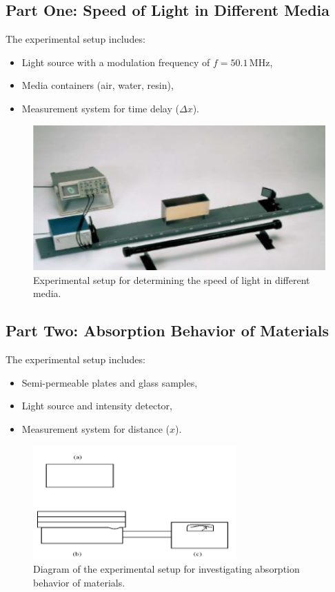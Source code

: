 \documentclass[journal]{IEEEtran}
\begin{document}
\subsection{Part One: Speed of Light in Different Media}
The experimental setup includes:
\begin{itemize}
    \item Light source with a modulation frequency of $f = 50.1 \, \text{MHz}$,
    \item Media containers (air, water, resin),
    \item Measurement system for time delay ($\Delta x$).
\end{itemize}

\begin{figure}[H]
    \centering
    \includegraphics[width=0.8\linewidth]{../IMAGES/speed_of_light_setup.png}
    \caption{Experimental setup for determining the speed of light in different media.}
    \label{fig:speed_of_light_setup}
\end{figure}

\subsection{Part Two: Absorption Behavior of Materials}
The experimental setup includes:
\begin{itemize}
    \item Semi-permeable plates and glass samples,
    \item Light source and intensity detector,
    \item Measurement system for distance ($x$).
\end{itemize}

\begin{figure}[H]
    \centering
    \includegraphics[width=0.8\linewidth]{../IMAGES/absorption_experiment_diagram.png}
    \caption{Diagram of the experimental setup for investigating absorption behavior of materials.}
    \label{fig:absorption_experiment_diagram}
\end{figure}
\end{document}
